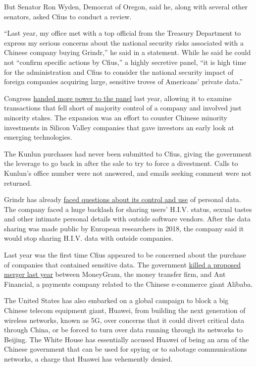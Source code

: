 But Senator Ron Wyden, Democrat of Oregon, said he, along with several
other senators, asked Cfius to conduct a review.

``Last year, my office met with a top official from the Treasury
Department to express my serious concerns about the national security
risks associated with a Chinese company buying Grindr,'' he said in a
statement. While he said he could not ``confirm specific actions by
Cfius,'' a highly secretive panel, ``it is high time for the
administration and Cfius to consider the national security impact of
foreign companies acquiring large, sensitive troves of Americans'
private data.''

Congress
\href{https://www.nytimes.com/2018/10/10/business/us-china-investment-cfius.html}{handed
more power to the panel} last year, allowing it to examine transactions
that fell short of majority control of a company and involved just
minority stakes. The expansion was an effort to counter Chinese minority
investments in Silicon Valley companies that gave investors an early
look at emerging technologies.

The Kunlun purchases had never been submitted to Cfius, giving the
government the leverage to go back in after the sale to try to force a
divestment. Calls to Kunlun's office number were not answered, and
emails seeking comment were not returned.

Grindr has already
\href{https://www.nytimes.com/2018/04/03/technology/grindr-sets-off-privacy-firestorm-after-sharing-users-hiv-status-data.html}{faced
questions about its control and use} of personal data. The company faced
a huge backlash for sharing users' H.I.V. status, sexual tastes and
other intimate personal details with outside software vendors. After the
data sharing was made public by European researchers in 2018, the
company said it would stop sharing H.I.V. data with outside companies.

Last year was the first time Cfius appeared to be concerned about the
purchase of companies that contained sensitive data. The government
\href{https://www.nytimes.com/2018/01/02/business/moneygram-ant-financial-china-cfius.html}{killed
a proposed merger last year} between MoneyGram, the money transfer firm,
and Ant Financial, a payments company related to the Chinese e-commerce
giant Alibaba.

The United States has also embarked on a global campaign to block a big
Chinese telecom equipment giant, Huawei, from building the next
generation of wireless networks, known as 5G, over concerns that it
could divert critical data through China, or be forced to turn over data
running through its networks to Beijing. The White House has essentially
accused Huawei of being an arm of the Chinese government that can be
used for spying or to sabotage communications networks, a charge that
Huawei has vehemently denied.

